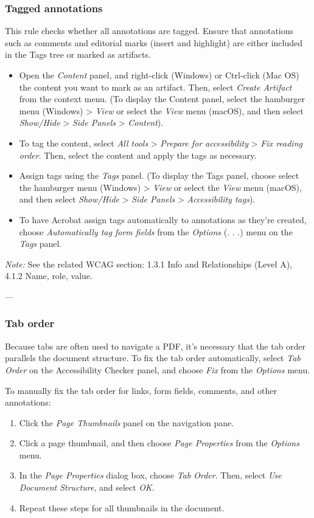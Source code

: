 \subsubsection{Tagged annotations}
This rule checks whether all annotations are tagged. Ensure that annotations such as comments and editorial marks (insert and highlight) are either included in the Tags tree or marked as artifacts\cite{AdobeHelpX}.
\begin{itemize}
    \item Open the \emph{Content} panel, and right-click (Windows) or Ctrl-click (Mac OS) the content you want to mark as an artifact. Then, select \emph{Create Artifact} from the context menu. (To display the Content panel, select the hamburger menu (Windows) > \emph{View} or select the \emph{View} menu (macOS), and then select \emph{Show/Hide} > \emph{Side Panels} > \emph{Content}).
    \item To tag the content, select \emph{All tools} > \emph{Prepare for accessibility} > \emph{Fix reading order}. Then, select the content and apply the tags as necessary.
    \item Assign tags using the \emph{Tags} panel. (To display the Tags panel, choose select the hamburger menu (Windows) > \emph{View} or select the \emph{View} menu (macOS), and then select \emph{Show/Hide} > \emph{Side Panels} > \emph{Accessibility tags}).
    \item To have Acrobat assign tags automatically to annotations as they're created, choose \emph{Automatically tag form fields} from the \emph{Options} (. . .) menu on the \emph{Tags} panel.
\end{itemize}

\vspace{0.5em}
\noindent\textit{Note:} See the related WCAG section: 1.3.1 Info and Relationships (Level A), 4.1.2 Name, role, value\cite{WCAG}.

---

\subsubsection{Tab order}
Because tabs are often used to navigate a PDF, it's necessary that the tab order parallels the document structure\cite{AdobeHelpX}.
To fix the tab order automatically, select \emph{Tab Order} on the Accessibility Checker panel, and choose \emph{Fix} from the \emph{Options} menu.

To manually fix the tab order for links, form fields, comments, and other annotations:
\begin{enumerate}
    \item Click the \emph{Page Thumbnails} panel on the navigation pane.
    \item Click a page thumbnail, and then choose \emph{Page Properties} from the \emph{Options} menu.
    \item In the \emph{Page Properties} dialog box, choose \emph{Tab Order}. Then, select \emph{Use Document Structure}, and select \emph{OK}.
    \item Repeat these steps for all thumbnails in the document.
\end{enumerate}

